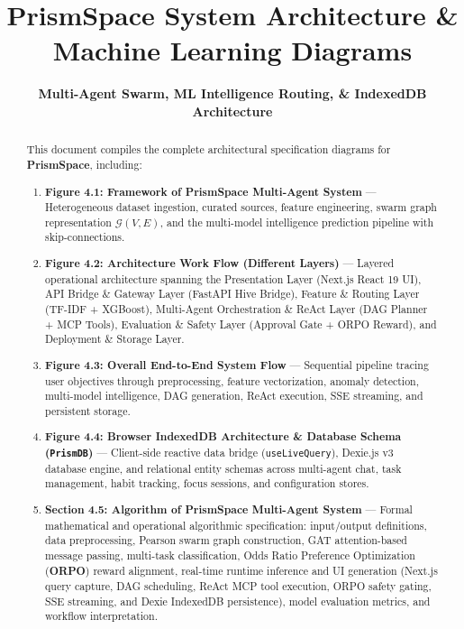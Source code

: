 \documentclass[11pt,a4paper]{article}
\title{\textbf{PrismSpace System Architecture \& Machine Learning Diagrams}}
\author{\textbf{Multi-Agent Swarm, ML Intelligence Routing, \& IndexedDB Architecture}}
\date{}
\begin{document}
\maketitle
\thispagestyle{empty}

\begin{abstract}
This document compiles the complete architectural specification diagrams for \textbf{PrismSpace}, including:
\begin{enumerate}
    \item \textbf{Figure 4.1: Framework of PrismSpace Multi-Agent System} --- Heterogeneous dataset ingestion, curated sources, feature engineering, swarm graph representation $\mathcal{G}(V, E)$, and the multi-model intelligence prediction pipeline with skip-connections.
    \item \textbf{Figure 4.2: Architecture Work Flow (Different Layers)} --- Layered operational architecture spanning the Presentation Layer (Next.js React 19 UI), API Bridge \& Gateway Layer (FastAPI Hive Bridge), Feature \& Routing Layer (TF-IDF + XGBoost), Multi-Agent Orchestration \& ReAct Layer (DAG Planner + MCP Tools), Evaluation \& Safety Layer (Approval Gate + ORPO Reward), and Deployment \& Storage Layer.
    \item \textbf{Figure 4.3: Overall End-to-End System Flow} --- Sequential pipeline tracing user objectives through preprocessing, feature vectorization, anomaly detection, multi-model intelligence, DAG generation, ReAct execution, SSE streaming, and persistent storage.
    \item \textbf{Figure 4.4: Browser IndexedDB Architecture \& Database Schema (\texttt{PrismDB})} --- Client-side reactive data bridge (\texttt{useLiveQuery}), Dexie.js v3 database engine, and relational entity schemas across multi-agent chat, task management, habit tracking, focus sessions, and configuration stores.
    \item \textbf{Section 4.5: Algorithm of PrismSpace Multi-Agent System} --- Formal mathematical and operational algorithmic specification: input/output definitions, data preprocessing, Pearson swarm graph construction, GAT attention-based message passing, multi-task classification, Odds Ratio Preference Optimization (\textbf{ORPO}) reward alignment, real-time runtime inference and UI generation (Next.js query capture, DAG scheduling, ReAct MCP tool execution, ORPO safety gating, SSE streaming, and Dexie IndexedDB persistence), model evaluation metrics, and workflow interpretation.
\end{enumerate}
\end{abstract}

\newpage


\newpage


\newpage


\newpage


\newpage

\end{document}
